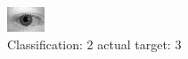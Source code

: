 \begin{figure}[h!]
\begin{center}
\includegraphics[width=0.60\columnwidth]{figures/ID628_class_2_target_3.png}
\end{center}
\caption{ Classification: 2 actual target: 3}
\label{fig:ID628_class_2_target_3}
\end{figure}
